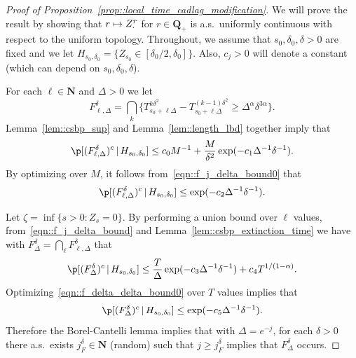 \documentclass[JEP,XML,SOM,Unicode]{cedram}
\newcommand\mto{\mathchoice{\longmapsto}{\mapsto}{\mapsto}{\mapsto}}
\theoremstyle{plain}
\numberwithin{theorem}{section}
\theoremstyle{definition}
\newcommand{\N}{\mathbf{N}}
\newcommand{\Q}{{\mathbf Q}}
\newcommand{\giv}{\,|\,}
\begin{document}
\begin{proof}[Proof of Proposition~\ref{prop::local_time_cadlag_modification}]
We will prove the result by showing that $r \mto Z_\cdot^r$ for $r \in \Q_+$ is a.s.\ uniformly continuous with respect to the uniform topology. Throughout, we assume that $s_0,\delta_0,\delta > 0$ are fixed and we let $H_{s_0,\delta_0} = \{ Z_{s_0} \in [\delta_0/2,\delta_0]\}$. Also, $c_j > 0$ will denote a constant (which can depend on $s_0,\delta_0,\delta$).

For each $\ell \in \N$ and $\Delta > 0$ we let\vspace*{-3pt}
\[
F_{\ell,\Delta}^{\delta} = \bigcap_k \bigl\{ T_{s_0+ \ell \Delta}^{k\delta^2} - T_{s_0+\ell \Delta}^{(k-1)\delta^2} \geq \Delta^{\alpha} \delta^{3\alpha} \bigr\}.
\]
Lemma~\ref{lem::csbp_sup} and Lemma~\ref{lem::length_lbd} together imply that\vspace*{-3pt}
\begin{equation}
\label{eqn::f_j_delta_bound0}
\p[ (F_{\ell,\Delta}^{\delta})^c \giv H_{s_0,\delta_0}] \leq c_0 M^{-1} + \frac{M}{\delta^2} \exp(-c_1 \Delta^{-1} \delta^{-1}).
\end{equation}
By optimizing over $M$, it follows from~\eqref{eqn::f_j_delta_bound0} that\vspace*{-3pt}
\begin{equation}
\label{eqn::f_j_delta_bound}
\p[ (F_{\ell,\Delta}^{\delta})^c \giv H_{s_0,\delta_0}] \leq \exp(-c_2 \Delta^{-1} \delta^{-1}).
\end{equation}

Let $\zeta = \inf\{ s > 0 : Z_s = 0\}$. By performing a union bound over $\ell$ values, from~\eqref{eqn::f_j_delta_bound} and Lemma~\ref{lem::csbp_extinction_time} we have with $F_\Delta^{\delta} = \bigcap_\ell F_{\ell,\Delta}^{\delta}$ that\vspace*{-3pt}
\begin{equation}
\label{eqn::f_delta_delta_bound0}
\p[ (F_\Delta^\delta)^c \giv H_{s_0,\delta_0}] \leq \frac{T}{\Delta} \exp(-c_3 \Delta^{-1} \delta^{-1}) + c_4 T^{1/(1-\alpha)}.
\end{equation}
Optimizing~\eqref{eqn::f_delta_delta_bound0} over $T$ values implies that
\begin{equation}
\label{eqn::f_delta_delta_bound}
\p[ (F_\Delta^\delta)^c \giv H_{s_0,\delta_0}] \leq \exp(-c_5 \Delta^{-1} \delta^{-1}).
\end{equation}
Therefore the Borel-Cantelli lemma implies that with $\Delta = e^{-j}$, for each $\delta > 0$ there a.s.\ exists $j_F^\delta \in \N$ (random) such that $j \geq j_F^\delta$ implies that $F_\Delta^\delta$ occurs.


\end{proof}
\end{document}
